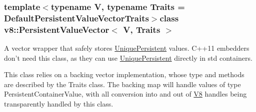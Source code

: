 \subsubsection*{template$<$typename V, typename Traits = Default\-Persistent\-Value\-Vector\-Traits$>$class v8\-::\-Persistent\-Value\-Vector$<$ V, Traits $>$}

A vector wrapper that safely stores \hyperlink{classv8_1_1UniquePersistent}{Unique\-Persistent} values. C++11 embedders don't need this class, as they can use \hyperlink{classv8_1_1UniquePersistent}{Unique\-Persistent} directly in std containers.

This class relies on a backing vector implementation, whose type and methods are described by the Traits class. The backing map will handle values of type Persistent\-Container\-Value, with all conversion into and out of \hyperlink{classv8_1_1V8}{V8} handles being transparently handled by this class. 


